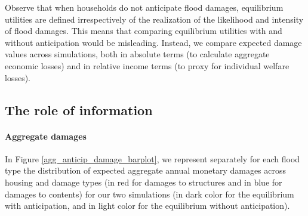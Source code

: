 \documentclass[12pt]{article}
\begin{document}

Observe that when households do not anticipate flood damages, equilibrium utilities are defined irrespectively of the realization of the likelihood and intensity of flood damages. This means that comparing equilibrium utilities with and without anticipation would be misleading. Instead, we compare expected damage values across simulations, both in absolute terms (to calculate aggregate economic losses) and in relative income terms (to proxy for individual welfare losses).



\subsection{The role of information}

\paragraph{Aggregate damages}

In Figure \ref{agg_anticip_damage_barplot}, we represent separately for each flood type the distribution of expected aggregate annual monetary damages across housing and damage types (in red for damages to structures and in blue for damages to contents) for our two simulations (in dark color for the equilibrium with anticipation, and in light color for the equilibrium without anticipation).
\end{document}
